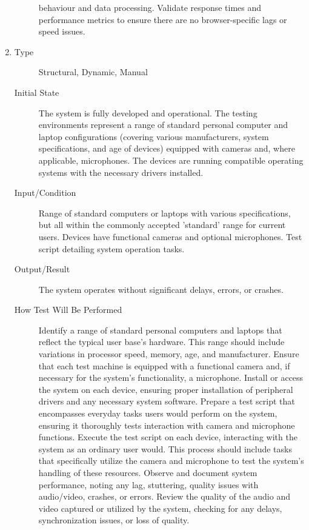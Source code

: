 \documentclass[12pt, titlepage]{article}
\begin{document}
\begin{enumerate}[NFR-T1]
\begin{description}
    behaviour and data processing. Validate response times and performance
    metrics to ensure there are no browser-specific lags or speed issues.
  \end{description}
\item \label{NFRT18}
  \begin{description}
  \item[Type] Structural, Dynamic, Manual
  \item[Initial State] The system is fully developed and operational. The
    testing environments represent a range of standard personal computer and
    laptop configurations (covering various manufacturers, system
    specifications, and age of devices) equipped with cameras and, where
    applicable, microphones. The devices are running compatible operating
    systems with the necessary drivers installed.
  \item[Input/Condition] Range of standard computers or laptops with various
    specifications, but all within the commonly accepted 'standard' range for
    current users. Devices have functional cameras and optional microphones.
    Test script detailing system operation tasks.
  \item[Output/Result] The system operates without significant delays, errors,
    or crashes.
  \item[How Test Will Be Performed] Identify a range of standard personal
    computers and laptops that reflect the typical user base's hardware. This
    range should include variations in processor speed, memory, age, and
    manufacturer. Ensure that each test machine is equipped with a functional
    camera and, if necessary for the system's functionality, a microphone.
    Install or access the system on each device, ensuring proper installation of
    peripheral drivers and any necessary system software. Prepare a test script
    that encompasses everyday tasks users would perform on the system, ensuring
    it thoroughly tests interaction with camera and microphone functions.
    Execute the test script on each device, interacting with the system as an
    ordinary user would. This process should include tasks that specifically
    utilize the camera and microphone to test the system’s handling of these
    resources. Observe and document system performance, noting any lag,
    stuttering, quality issues with audio/video, crashes, or errors. Review the
    quality of the audio and video captured or utilized by the system, checking
    for any delays, synchronization issues, or loss of quality.
  \end{description}

\end{enumerate}
\end{document}

